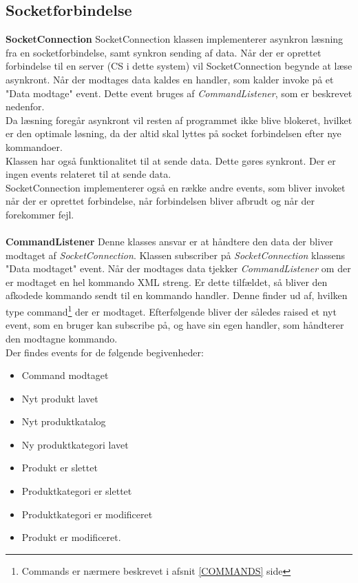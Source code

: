 \subsection{Socketforbindelse}
\textbf{SocketConnection}
SocketConnection klassen implementerer asynkron læsning fra en socketforbindelse, samt synkron sending af data. Når der er oprettet forbindelse til en server (\gls{CS} i dette system) vil SocketConnection begynde at læse asynkront. Når der modtages data kaldes en handler, som kalder invoke på et "Data modtage" event. Dette event bruges af \textit{CommandListener}, som er beskrevet nedenfor.\\
Da læsning foregår asynkront vil resten af programmet ikke blive blokeret, hvilket er den optimale løsning, da der altid skal lyttes på socket forbindelsen efter nye kommandoer.\\
Klassen har også funktionalitet til at sende data. Dette gøres synkront. Der er ingen events relateret til at sende data.\\
SocketConnection implementerer også en række andre events, som bliver invoket når der er oprettet forbindelse, når forbindelsen bliver afbrudt og når der forekommer fejl.\\\\
 

\textbf{CommandListener}
Denne klasses ansvar er at håndtere den data der bliver modtaget af \textit{SocketConnection}. Klassen subscriber på \textit{SocketConnection} klassens "Data modtaget" event. Når der modtages data tjekker \textit{CommandListener} om der er modtaget en hel kommando XML streng. Er dette tilfældet, så bliver den afkodede kommando sendt til en kommando handler. Denne finder ud af, hvilken type command\footnote{Commands er nærmere beskrevet i afsnit \ref{COMMANDS} side \pageref{COMMANDS}} der er modtaget. Efterfølgende bliver der således raised et nyt event, som en bruger kan subscribe på, og have sin egen handler, som håndterer den modtagne kommando.\\
Der findes events for de følgende begivenheder:

\begin{itemize}
	\item Command modtaget
	\item Nyt produkt lavet
	\item Nyt produktkatalog
	\item Ny produktkategori lavet
	\item Produkt er slettet
	\item Produktkategori er slettet
	\item Produktkategori er modificeret
	\item Produkt er modificeret.
\end{itemize}

